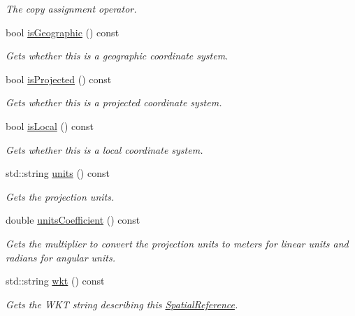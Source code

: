 \begin{DoxyCompactItemize}
\begin{DoxyCompactList}\small\item\em The copy assignment operator. \end{DoxyCompactList}\item 
bool \hyperlink{group___imagery_module_ga2fcc958cf2ef9ab876162ac40df35913}{is\+Geographic} () const 
\begin{DoxyCompactList}\small\item\em Gets whether this is a geographic coordinate system. \end{DoxyCompactList}\item 
bool \hyperlink{group___imagery_module_ga0344d276d07a4f5a0ae3ae113a89026d}{is\+Projected} () const 
\begin{DoxyCompactList}\small\item\em Gets whether this is a projected coordinate system. \end{DoxyCompactList}\item 
bool \hyperlink{group___imagery_module_gad4b4d9d82c2ab268d523048576a1655e}{is\+Local} () const 
\begin{DoxyCompactList}\small\item\em Gets whether this is a local coordinate system. \end{DoxyCompactList}\item 
std\+::string \hyperlink{group___imagery_module_gac88786aa96148f649fc063229cebba89}{units} () const 
\begin{DoxyCompactList}\small\item\em Gets the projection units. \end{DoxyCompactList}\item 
double \hyperlink{group___imagery_module_gab96d28b4a4fc932393d3fc3d536e6a80}{units\+Coefficient} () const 
\begin{DoxyCompactList}\small\item\em Gets the multiplier to convert the projection units to meters for linear units and radians for angular units. \end{DoxyCompactList}\item 
std\+::string \hyperlink{group___imagery_module_ga8654dc584206ce3675ee3330a94c06c9}{wkt} () const 
\begin{DoxyCompactList}\small\item\em Gets the W\+KT string describing this \hyperlink{classdg_1_1deepcore_1_1imagery_1_1_spatial_reference}{Spatial\+Reference}. \end{DoxyCompactList}\item 

\end{DoxyCompactItemize}
